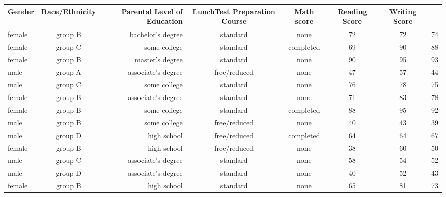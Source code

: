 \documentclass{article}
\begin{document}
	\begin{table}[h!]
		\begin{tabular}{l|c|r|c|c|c|c|c}
			\textbf{Gender}&\textbf{Race/Ethnicity}&\textbf{Parental Level of Education}&\textbf{Lunch}\textbf{Test Preparation Course}&\textbf{Math score}&\textbf{Reading Score}&\textbf{Writing Score}\\
			\hline
			female&group B&bachelor's degree&standard&none&72&72&74\\
			female&group C&some college&standard&completed&69&90&88\\
			female&group B&master's degree&standard&none&90&95&93\\
			male&group A&associate's degree&free/reduced&none&47&57&44\\
			male&group C&some college&standard&none&76&78&75\\
			female&group B&associate's degree&standard&none&71&83&78\\
			female&group B&some college&standard&completed&88&95&92\\
			male&group B&some college&free/reduced&none&40&43&39\\
			male&group D&high school&free/reduced&completed&64&64&67\\
			female&group B&high school&free/reduced&none&38&60&50\\
			male&group C&associate's degree&standard&none&58&54&52\\
			male&group D&associate's degree&standard&none&40&52&43\\
			female&group B&high school&standard&none&65&81&73\\
			
			
			
			
			
		\end{tabular}
	\end{table}


		
\end{document}
